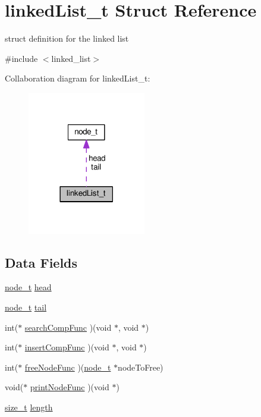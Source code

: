 \hypertarget{structs__ll}{}\section{linked\+List\+\_\+t Struct Reference}
\label{structs__ll}


struct definition for the linked list  




{\ttfamily \#include $<$linked\+\_\+list$>$}



Collaboration diagram for linked\+List\+\_\+t\+:\nopagebreak
\begin{figure}[H]
\begin{center}
\leavevmode
\includegraphics[width=146pt]{structs__ll__coll__graph}
\end{center}
\end{figure}
\subsection*{Data Fields}
\begin{DoxyCompactItemize}
\item 
\hyperlink{structnode__t}{node\+\_\+t} \hyperlink{structs__ll_a0056de8ffd1d9af11ed1a8bb771ae227}{head}
\item 
\hyperlink{structnode__t}{node\+\_\+t} \hyperlink{structs__ll_a3253fe5f72d8914dd8331e74aba9982e}{tail}
\item 
int($\ast$ \hyperlink{structs__ll_ac22c97ea79a7ec45eb27584f2f91295c}{search\+Comp\+Func} )(void $\ast$, void $\ast$)
\item 
int($\ast$ \hyperlink{structs__ll_accf6a1a7fe14f0693107a00a47b86d0d}{insert\+Comp\+Func} )(void $\ast$, void $\ast$)
\item 
int($\ast$ \hyperlink{structs__ll_a3cf5521a73fc3474e83aef51c777bb7f}{free\+Node\+Func} )(\hyperlink{structnode__t}{node\+\_\+t} $\ast$node\+To\+Free)
\item 
void($\ast$ \hyperlink{structs__ll_ad3b310fea19fca7898583a8c0eb87449}{print\+Node\+Func} )(void $\ast$)
\item 
\hyperlink{system_8h_a7c94ea6f8948649f8d181ae55911eeaf}{size\+\_\+t} \hyperlink{structs__ll_abeb40a7e7b4c71ba09151cde4005c201}{length}
\end{DoxyCompactItemize}


